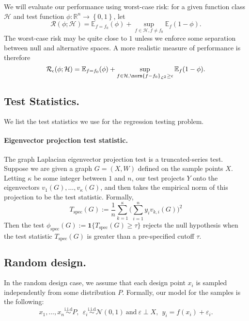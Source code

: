 \documentclass{article}
\newcommand{\Reals}{\mathbb{R}}
\newcommand{\set}[1]{\left\{#1\right\}}
\newcommand{\1}{\mathbf{1}}
\newcommand{\Leb}{\mathcal{L}}
\newcommand{\Ebb}{\mathbb{E}}
\newcommand{\spec}{\mathrm{spec}}
\theoremstyle{alden}
\theoremstyle{aldenthm}
\theoremstyle{definition}
\theoremstyle{remark}
\begin{document}
We will evaluate our performance using worst-case risk: for a given function class $\mathcal{H}$ and test function $\phi: \Reals^n \to \set{0,1}$, let
\begin{equation*}
\mathcal{R}(\phi; \mathcal{H}) = \Ebb_{f = f_0}(\phi) + \sup_{f \in \mathcal{H}, f \neq f_0} \Ebb_f(1 - \phi).
\end{equation*}
The worst-case risk may be quite close to $1$ unless we enforce some separation between null and alternative spaces. A more realistic measure of performance is therefore
\begin{equation*}
\mathcal{R}_{\epsilon}(\phi; \mathcal{H}) = \Ebb_{f = f_0}(\phi) + \sup_{f \in \mathcal{H}, \norm{f - f_0}_{\Leb^2} \geq \epsilon} \Ebb_f(1 - \phi).
\end{equation*}

\subsection{Test Statistics.}
We list the test statistics we use for the regression testing problem.

\paragraph{Eigenvector projection test statistic.}
The graph Laplacian eigenvector projection test is a truncated-series test. Suppose we are given a graph $G = (X,W)$ defined on the sample points $X$.  Letting $\kappa$ be some integer between $1$ and $n$, our test projects $Y$ onto the eigenvectors $v_1(G),\ldots,v_{\kappa}(G)$, and then takes the empirical norm of this projection to be the test statistic. Formally,
\begin{equation*}
T_{\mathrm{spec}}(G) := \frac{1}{n} \sum_{k = 1}^{\kappa} \Biggl(\sum_{i = 1}^{n} y_i v_{k,i}(G)\Biggr)^2
\end{equation*}
Then the test $\phi_{\spec}(G) := \1\{T_{\spec}(G) \geq \tau\}$ rejects the null hypothesis when the test statistic $T_{\mathrm{spec}}(G)$ is greater than a pre-specified cutoff $\tau$.

\subsection{Random design.}
In the random design case, we assume that each design point $x_i$ is sampled independently from some distribution $P$. Formally, our model for the samples is the following:
\begin{equation}
\label{eqn:regression_random_design_known_variance}
x_1,\ldots,x_n \overset{\textrm{i.i.d}}{\sim} P,~~ \varepsilon_i \overset{\textrm{i.i.d}}{\sim} \mathcal{N}(0,1)~\textrm{and}~ \varepsilon \perp X,~~ y_i = f(x_i) + \varepsilon_i.
\end{equation}
\end{document}
